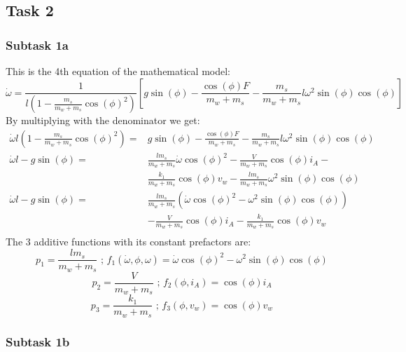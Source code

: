 \documentclass[a4paper, 12pt]{scrartcl}
\begin{document}
\subsection{Task 2}
\subsubsection{Subtask 1a}
This is the 4th equation of the mathematical model:
\begin{equation}
	\dot{\omega} = \frac{1}{l\left(1-\frac{m_s}{m_w + m_s} \cos(\phi)^2\right)} \left[ g \sin(\phi) -  \frac{\cos(\phi)F}{m_w + m_s} - \frac{m_s}{m_w + m_s} {l \omega^2} \sin(\phi) \cos(\phi) \right]
\end{equation}
By multiplying with the denominator we get: 
\begin{equation}
	\begin{split}
		\dot{\omega}l \left(1-\frac{m_s}{m_w + m_s} \cos(\phi)^2\right) = & g \sin(\phi) -  \frac{\cos(\phi)F}{m_w + m_s} - \frac{m_s}{m_w + m_s} {l \omega^2} \sin(\phi) \cos(\phi) \\
		\dot{\omega}l - g \sin(\phi) = & \frac{l m_s}{m_w + m_s} \dot{\omega} \cos(\phi)^2 - \frac{V}{m_w + m_s} \cos(\phi) i_A - \\
		& \frac{k_1}{m_w + m_s} \cos(\phi) v_w - \frac{l m_s}{m_w + m_s} \omega^2 \sin(\phi) \cos(\phi) \\
		\dot{\omega}l - g \sin(\phi) = & \frac{l m_s}{m_w + m_s} \left( \dot{\omega} \cos(\phi)^2 - \omega^2 \sin(\phi) \cos(\phi) \right) \\ 
		& - \frac{V}{m_w + m_s} \cos(\phi) i_A - \frac{k_1}{m_w + m_s} \cos(\phi) v_w \\
	\end{split}
\end{equation}
The 3 additive functions with its constant prefactors are: 
\begin{equation}
	p_1 = \frac{l m_s}{m_w + m_s} \text{ ; } f_1(\dot{\omega}, \phi, \omega) = \dot{\omega} \cos(\phi)^2 - \omega^2 \sin(\phi) \cos(\phi)
\end{equation}
\begin{equation}
	p_2 = \frac{V}{m_w + m_s}  \text{ ; } f_2(\phi, i_A) = \cos(\phi) i_A
\end{equation}
\begin{equation}
	p_3 = \frac{k_1}{m_w + m_s} \text{ ; } f_3(\phi, v_w) = \cos(\phi) v_w
\end{equation}

\subsubsection{Subtask 1b}
\end{document}
